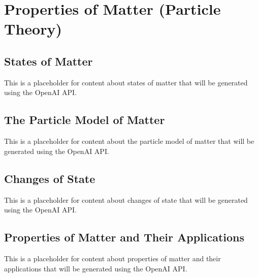 \chapter{Properties of Matter (Particle Theory)}


\section{States of Matter}

This is a placeholder for content about states of matter that will be generated using the OpenAI API.

\section{The Particle Model of Matter}

This is a placeholder for content about the particle model of matter that will be generated using the OpenAI API.

\section{Changes of State}

This is a placeholder for content about changes of state that will be generated using the OpenAI API.

\section{Properties of Matter and Their Applications}

This is a placeholder for content about properties of matter and their applications that will be generated using the OpenAI API.